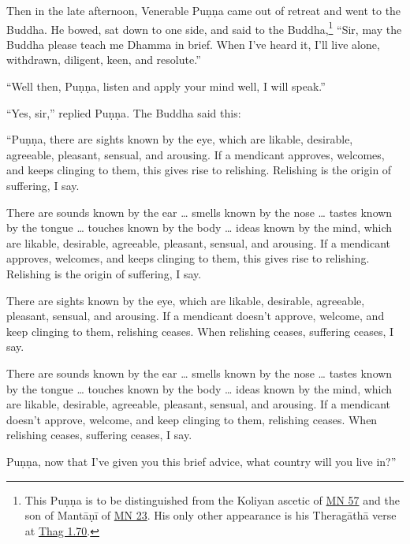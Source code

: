 \documentclass[12pt,openany]{book}%
\begin{document}
Then in the late afternoon, Venerable \textsanskrit{Puṇṇa} came out of retreat and went to the Buddha. He bowed, sat down to one side, and said to the Buddha,\footnote{This \textsanskrit{Puṇṇa} is to be distinguished from the Koliyan ascetic of \href{https://suttacentral.net/mn57/en/sujato}{MN 57} and the son of \textsanskrit{Mantāṇī} of \href{https://suttacentral.net/mn23/en/sujato}{MN 23}. His only other appearance is his \textsanskrit{Theragāthā} verse at \href{https://suttacentral.net/thag1.70/en/sujato}{Thag 1.70}. } “Sir, may the Buddha please teach me Dhamma in brief. When I’ve heard it, I’ll live alone, withdrawn, diligent, keen, and resolute.” 

“Well then, \textsanskrit{Puṇṇa}, listen and apply your mind well, I will speak.” 

“Yes, sir,” replied \textsanskrit{Puṇṇa}. The Buddha said this: 

“\textsanskrit{Puṇṇa}, there are sights known by the eye, which are likable, desirable, agreeable, pleasant, sensual, and arousing. If a mendicant approves, welcomes, and keeps clinging to them, this gives rise to relishing. Relishing is the origin of suffering, I say. 

There are sounds known by the ear … smells known by the nose … tastes known by the tongue … touches known by the body … ideas known by the mind, which are likable, desirable, agreeable, pleasant, sensual, and arousing. If a mendicant approves, welcomes, and keeps clinging to them, this gives rise to relishing. Relishing is the origin of suffering, I say. 

There are sights known by the eye, which are likable, desirable, agreeable, pleasant, sensual, and arousing. If a mendicant doesn’t approve, welcome, and keep clinging to them, relishing ceases. When relishing ceases, suffering ceases, I say. 

There are sounds known by the ear … smells known by the nose … tastes known by the tongue … touches known by the body … ideas known by the mind, which are likable, desirable, agreeable, pleasant, sensual, and arousing. If a mendicant doesn’t approve, welcome, and keep clinging to them, relishing ceases. When relishing ceases, suffering ceases, I say. 

\textsanskrit{Puṇṇa}, now that I’ve given you this brief advice, what country will you live in?” 
\end{document}
